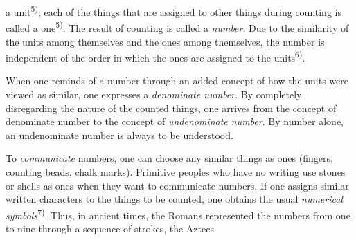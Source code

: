 \thispagestyle{fancy}

\vspace{0.5cm}

a unit\textsuperscript{5)}; each of the things that are assigned to other things during counting is called a one\textsuperscript{5)}. The result of counting is called a \textit{number}. Due to the similarity of the units among themselves and the ones among themselves, the number is independent of the order in which the ones are assigned to the units\textsuperscript{6)}.

When one reminds of a number through an added concept of how the units were viewed as similar, one expresses a \textit{denominate number}. By completely disregarding the nature of the counted things, one arrives from the concept of denominate number to the concept of \textit{undenominate number}. By number alone, an undenominate number is always to be understood.

To \textit{communicate} numbers, one can choose any similar things as ones (fingers, counting beads, chalk marks). Primitive peoples who have no writing use stones or shells as ones when they want to communicate numbers. If one assigns similar written characters to the things to be counted, one obtains the usual \textit{numerical symbols}\textsuperscript{7)}. Thus, in ancient times, the Romans represented the \hfill numbers \hfill from \hfill one \hfill to \hfill nine \hfill through \hfill a \hfill sequence \hfill of  \hfill strokes, the \hfill Aztecs

